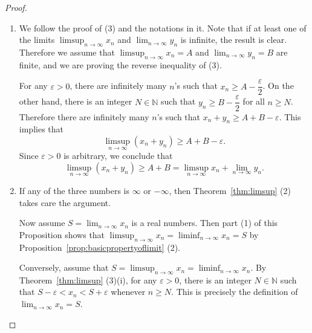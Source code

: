 \begin{proof}
\begin{enumerate}[(1)]
    \item We follow the proof of (3) and the notations in it.  Note that if at least one of the limits $\displaystyle \limsup_{n\to\infty} x_n$ and $\displaystyle \lim_{n\to\infty} y_n$ is infinite, the result is clear.  Therefore we assume that $\displaystyle \limsup_{n\to\infty} x_n = A$ and $\displaystyle \lim_{n\to\infty} y_n = B$ are finite, and we are proving the reverse inequality of (3).

      For any $\varepsilon > 0$, there are infinitely many $n$'s such that $x_n \geqslant A - \dfrac{\varepsilon}{2}$.  On the other hand, there is an integer $N \in \mathbb{N}$ such that $y_n \geqslant B - \dfrac{\varepsilon}{2}$ for all $n \geqslant N$.  Therefore there are infinitely many $n$'s such that $x_n + y_n \geqslant A + B - \varepsilon$.  This implies that
      \[
	\limsup_{n\to\infty} (x_n + y_n) \geqslant A + B - \varepsilon.
      \]
      Since $\varepsilon > 0$ is arbitrary, we conclude that
      \[
	\limsup_{n\to\infty} (x_n + y_n) \geqslant A + B = \limsup_{n\to\infty} x_n + \lim_{n\to\infty} y_n.
      \]

    \item If any of the three numbers is $\infty$ or $-\infty$, then Theorem~\ref{thm:limsup} (2) takes care the argument.

      Now assume $\displaystyle S = \lim_{n\to\infty} x_n$ is a real numbers.  Then part (1) of this Proposition shows that $\displaystyle \limsup_{n\to\infty} x_n = \liminf_{n\to\infty} x_n = S$ by Proposition~\ref{prop:basicpropertyoflimit} (2).

      Conversely, assume that $\displaystyle S = \limsup_{n\to\infty} x_n = \liminf_{n\to\infty} x_n$.  By Theorem~\ref{thm:limsup} (3)(i), for any $\varepsilon > 0$, there is an integer $N \in \mathbb{N}$ such that $S - \varepsilon < x_n < S + \varepsilon$ whenever $n \geqslant N$.  This is precisely the definition of $\displaystyle \lim_{n\to\infty} x_n = S$.
  \end{enumerate}
\end{proof}
